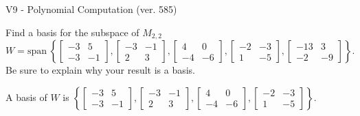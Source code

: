 \begin{exercise}
  \begin{exerciseTitle}V9 - Polynomial Computation (ver. 585)\end{exerciseTitle}
  \begin{exerciseStatement}
    Find a basis for the subspace of \(M_{2,2}\) 
\[W=\mathrm{span}\ \left\{\left[\begin{array}{cc}
-3 & 5 \\
-3 & -1
\end{array}\right] , \left[\begin{array}{cc}
-3 & -1 \\
2 & 3
\end{array}\right] , \left[\begin{array}{cc}
4 & 0 \\
-4 & -6
\end{array}\right] , \left[\begin{array}{cc}
-2 & -3 \\
1 & -5
\end{array}\right] , \left[\begin{array}{cc}
-13 & 3 \\
-2 & -9
\end{array}\right]\right\}.\]
 Be sure to explain why your result is a basis.


  \end{exerciseStatement}
  \begin{exerciseAnswer}
   A basis of \(W\) is  \(\left\{\left[\begin{array}{cc}
-3 & 5 \\
-3 & -1
\end{array}\right] , \left[\begin{array}{cc}
-3 & -1 \\
2 & 3
\end{array}\right] , \left[\begin{array}{cc}
4 & 0 \\
-4 & -6
\end{array}\right] , \left[\begin{array}{cc}
-2 & -3 \\
1 & -5
\end{array}\right]\right\}\).
  


  \end{exerciseAnswer}
\end{exercise}